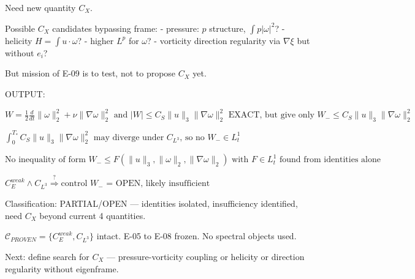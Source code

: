 \documentclass[11pt]{article}
\begin{document}
Need new quantity $C_X$.

Possible $C_X$ candidates bypassing frame:
- pressure: $p$ structure, $\int p |\omega|^2$?
- helicity $H=\int u\cdot\omega$?
- higher $L^p$ for $\omega$?
- vorticity direction regularity via $\nabla\xi$ but without $e_i$?

But mission of E-09 is to test, not to propose $C_X$ yet.

OUTPUT:

$\boxed{W=\frac12\frac{d}{dt}\|\omega\|_2^2+\nu\|\nabla\omega\|_2^2\text{ and }|W|\le C_S\|u\|_3\|\nabla\omega\|_2^2\text{ EXACT, but give only }W_-\le C_S\|u\|_3\|\nabla\omega\|_2^2}$

$\boxed{\int_0^{T_*}C_S\|u\|_3\|\nabla\omega\|_2^2\text{ may diverge under }C_{L^3}\text{, so no }W_-\in L^1_t}$

$\boxed{\text{No inequality of form }W_-\le F(\|u\|_3,\|\omega\|_2,\|\nabla\omega\|_2)\text{ with }F\in L^1_t\text{ found from identities alone}}$

$\boxed{C_E^{weak}\land C_{L^3}\stackrel{?}{\Rightarrow}\text{control }W_-\text{ = OPEN, likely insufficient}}$

Classification: PARTIAL/OPEN — identities isolated, insufficiency identified, need $C_X$ beyond current 4 quantities.

$\mathcal{C}_{PROVEN}=\{C_E^{weak},C_{L^3}\}$ intact. E-05 to E-08 frozen. No spectral objects used.

Next: define search for $C_X$ — pressure-vorticity coupling or helicity or direction regularity without eigenframe.
\end{document}
